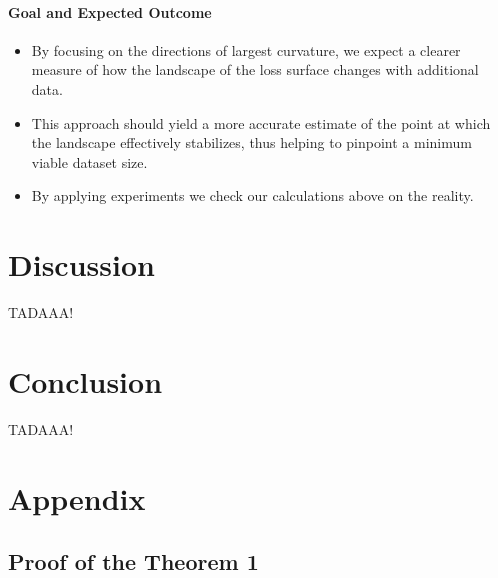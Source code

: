 \documentclass{article}
\begin{document}
\paragraph{Goal and Expected Outcome}
\begin{itemize}
  \item By focusing on the directions of largest curvature, we expect a clearer
        measure of how the landscape of the loss surface changes with additional data.
  \item This approach should yield a more accurate estimate of the point at which the
        landscape effectively stabilizes, thus helping to pinpoint a minimum viable dataset size.
  \item By applying experiments we check our calculations above on the reality.
\end{itemize}



\section{Discussion}\label{sec:disc}

TADAAA!

\section{Conclusion}\label{sec:concl}

TADAAA!







\newpage
\appendix
\section{Appendix}

\subsection{Proof of the Theorem 1}
\end{document}
